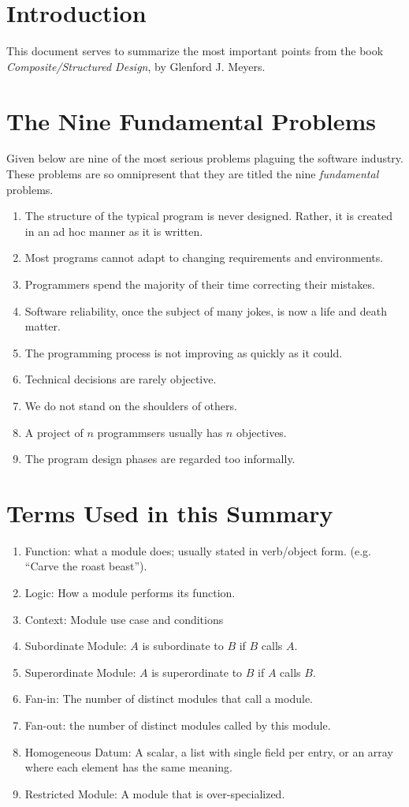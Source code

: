 \documentclass[format.tex]{subfiles}
\begin{document}
\section{Introduction}
This document serves to summarize the most important points from the book
{\it Composite/Structured Design}, by Glenford J. Meyers.

\section{The Nine Fundamental Problems}
Given below are nine of the most serious problems plaguing the software
industry. These problems are so omnipresent that they are titled the nine
{\it fundamental} problems.

\begin{enumerate}
\item The structure of the typical program is never designed. Rather, it is
  created in an ad hoc manner as it is written.
\item Most programs cannot adapt to changing requirements and environments.
\item Programmers spend the majority of their time correcting their mistakes.
\item Software reliability, once the subject of many jokes, is now a life and
  death matter.
\item The programming process is not improving as quickly as it could.
\item Technical decisions are rarely objective.
\item We do not stand on the shoulders of others.
\item A project of $n$ programmsers usually has $n$ objectives.
\item The program design phases are regarded too informally.
\end{enumerate}

\section{Terms Used in this Summary}
\begin{enumerate}
\item Function: what a module does; usually stated in verb/object form. (e.g.
  ``Carve the roast beast'').
\item Logic: How a module performs its function.
\item Context: Module use case and conditions
\item Subordinate Module: $A$ is subordinate to $B$ if $B$ calls $A$.
\item Superordinate Module: $A$ is superordinate to $B$ if $A$ calls $B$.
\item Fan-in: The number of distinct modules that call a module.
\item Fan-out: the number of distinct modules called by this module.
\item Homogeneous Datum: A scalar, a list with single field per entry, or an
  array where each element has the same meaning.
\item Restricted Module: A module that is over-specialized.
\end{enumerate}
\end{document}
